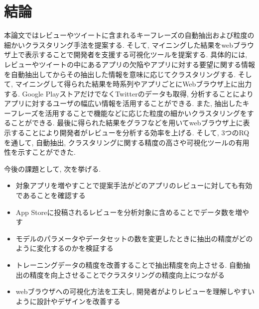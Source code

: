 \chapter{結論}
\label{chap:keturon}

本論文ではレビューやツイートに含まれるキーフレーズの自動抽出および粒度の細かいクラスタリング手法を提案する. そして, マイニングした結果をwebブラウザ上で表示することで開発者を支援する可視化ツールを提案する. 
具体的には, レビューやツイートの中にあるアプリの欠陥やアプリに対する要望に関する情報を自動抽出してからその抽出した情報を意味に応じてクラスタリングする.  そして, マイニングして得られた結果を時系列やアプリごとにWebブラウザ上に出力する.
Google PlayストアだけでなくTwitterのデータも取得, 分析することによりアプリに対するユーザの幅広い情報を活用することができる. また, 抽出したキーフレーズを活用することで機能などに応じた粒度の細かいクラスタリングをすることができる. 最後に得られた結果をグラフなどを用いてwebブラウザ上に表示することにより開発者がレビューを分析する効率を上げる. 
そして, 3つのRQを通して, 自動抽出, クラスタリングに関する精度の高さや可視化ツールの有用性を示すことができた. 

今後の課題として, 次を挙げる. 

\begin{itemize}
    \item 対象アプリを増やすことで提案手法がどのアプリのレビューに対しても有効であることを確認する
    \item App Storeに投稿されるレビューを分析対象に含めることでデータ数を増やす
    \item モデルのパラメータやデータセットの数を変更したときに抽出の精度がどのように変化するのかを検証する
    \item トレーニングデータの精度を改善することで抽出精度を向上させる. 自動抽出の精度を向上させることでクラスタリングの精度向上につながる
    \item webブラウザへの可視化方法を工夫し, 開発者がよりレビューを理解しやすいように設計やデザインを改善する
\end{itemize}
